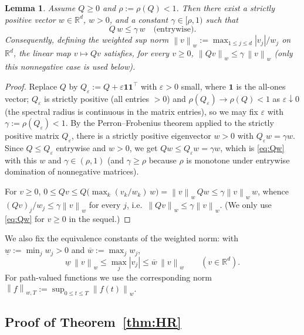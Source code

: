 \documentclass{amsart}
\newtheorem{lemma}{Lemma}
\theoremstyle{definition}
\theoremstyle{remark}
\newcommand{\R}{\mathbb{R}}
\newcommand{\norm}[1]{\left\lVert#1\right\rVert}
\begin{document}
\begin{lemma}\label{lem:weight}
Assume $Q\ge0$ and $\rho:=\rho(Q)<1$. Then there exist a strictly positive
vector $w\in\R^d$, $w>0$, and a constant $\gamma\in[\rho,1)$ such that
\begin{equation}\label{eq:Qw}
  Q\,w\le \gamma\,w \quad\text{(entrywise).}
\end{equation}
Consequently, defining the weighted sup norm
$\norm{v}_w:=\max_{1\le j\le d}|v_j|/w_j$ on $\R^d$, the linear map
$v\mapsto Qv$ satisfies, for every $v\ge0$,
$\norm{Qv}_w\le\gamma\,\norm{v}_w$ (only this nonnegative case is used
below).
\end{lemma}

\begin{proof}
Replace $Q$ by $Q_\varepsilon:=Q+\varepsilon\mathbf 1\mathbf 1^\top$ with
$\varepsilon>0$ small, where $\mathbf 1$ is the all-ones vector; $Q_\varepsilon$
is strictly positive (all entries $>0$) and $\rho(Q_\varepsilon)\to\rho(Q)<1$ as
$\varepsilon\downarrow0$ (the spectral radius is continuous in the matrix
entries), so we may fix $\varepsilon$ with $\gamma:=\rho(Q_\varepsilon)<1$. By
the Perron--Frobenius theorem applied to the strictly positive matrix
$Q_\varepsilon$, there is a strictly positive eigenvector $w>0$ with
$Q_\varepsilon w=\gamma w$. Since $Q\le Q_\varepsilon$ entrywise and $w>0$, we
get $Qw\le Q_\varepsilon w=\gamma w$, which is \eqref{eq:Qw} with this $w$ and
$\gamma\in(\rho,1)$ (and $\gamma\ge\rho$ because $\rho$ is monotone under
entrywise domination of nonnegative matrices).

For $v\ge0$, $0\le Qv\le Q\big(\max_k(v_k/w_k)\,w\big)
=\norm{v}_w\,Qw\le \gamma\norm{v}_w\,w$, whence
$(Qv)_j/w_j\le\gamma\norm{v}_w$ for every $j$, i.e.\
$\norm{Qv}_w\le\gamma\norm{v}_w$. (We only use \eqref{eq:Qw} for $v\ge0$ in the
sequel.)
\end{proof}

We also fix the equivalence constants of the weighted norm: with
$\underline w:=\min_j w_j>0$ and $\overline w:=\max_j w_j$,
\begin{equation}\label{eq:equiv}
  \underline w\,\norm{v}_w\le \max_j|v_j|\le \overline w\,\norm{v}_w
  \qquad(v\in\R^d).
\end{equation}
For path-valued functions we use the corresponding norm
$\norm{f}_{w,T}:=\sup_{0\le t\le T}\norm{f(t)}_w$.

\subsection{Proof of Theorem~\ref{thm:HR}}
\end{document}
